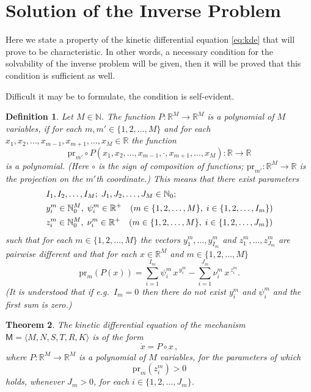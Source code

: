 \documentclass[12pt,a4paper]{article}
\newtheorem{theorem}{Theorem}[section]
\newtheorem{definition}[theorem]{Definition}
\newcommand{\N}{\mathbb{N}}
\newcommand{\R}{\mathbb{R}}
\newcommand{\Nz}{\mathbb{N}_0}
\begin{document}
\section{Solution of the Inverse Problem}

Here we state a property of the kinetic differential equation \eqref{eq:kde} that will prove to be characteristic.  In other words, a necessary condition for the solvability of the inverse problem will be given, then it will be proved that this condition is sufficient as well.

Difficult it may be to formulate, the condition is self-evident.

\begin{definition}\label{def:polynomial}
Let $M \in \N$.  The function $P \colon \R^M \to \R^M$ is a \emph{polynomial of $M$ variables}, if for each $m, m' \in \{1,2,\ldots,M\}$ and for each $x_1, x_2, \ldots, x_{m-1}, x_{m+1}, \ldots, x_M \in \R$ the function
\[
  \mathrm{pr}_{m'} \circ P(x_1, x_2, \ldots, x_{m-1}, \cdot, x_{m+1}, \ldots, x_M) \colon \R \to \R
\]
is a polynomial.  (Here $\circ$ is the sign of composition of functions;\; $\mathrm{pr}_{m'} \colon \R^M \to \R$ is the projection on the $m'$th coordinate.)  This means that there exist parameters
\begin{align}\label{eq:params}
  & I_1, I_2, \ldots, I_M;\; J_1, J_2, \ldots, J_M \in \Nz; \notag \\
  & y_i^m \in \Nz^M,\; \psi_i^m \in \R^+ \quad
    (m \in \{1,2,\ldots,M\},\; i \in \{1,2,\ldots,I_m\}) \notag \\
  & z_i^m \in \Nz^M,\; \nu_i^m \in \R^+ \quad
    (m \in \{1,2,\ldots,M\},\; i \in \{1,2,\ldots,J_m\})
\end{align}
such that for each $m \in \{1,2,\ldots,M\}$ the vectors $y_1^m, \ldots, y_{I_m}^m$ and $z_1^m, \ldots, z_{J_m}^m$ are pairwise different and that for each $x \in \R^M$ and $m \in \{1,2,\ldots,M\}$
\[
  \mathrm{pr}_m(P(x)) = \sum_{i=1}^{I_m} \psi_i^m\, x^{\,y_i^m}
  - \sum_{i=1}^{J_m} \nu_i^m\, x^{\,z_i^m}.
\]
(It is understood that if e.g.\ $I_m = 0$ then there do not exist $y_i^m$ and $\psi_i^m$ and the first sum is zero.)
\end{definition}

\begin{theorem}\label{thm:necessary}
The kinetic differential equation of the mechanism $\mathsf{M} = \langle M, N, S, T, R, K \rangle$ is of the form
\[
  \dot{x} = P \circ x\,,
\]
where $P \colon \R^M \to \R^M$ is a polynomial of $M$ variables, for the parameters of which
\[
  \mathrm{pr}_m(z_i^m) > 0
\]
holds, whenever $J_m > 0$, for each $i \in \{1,2,\ldots,J_m\}$.
\end{theorem}
\end{document}
